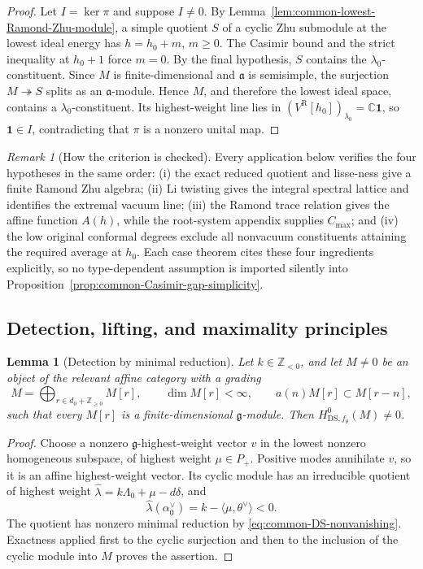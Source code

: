 \documentclass[11pt,reqno]{amsart}
\newtheorem{lemma}[theorem]{Lemma}
\theoremstyle{definition}
\theoremstyle{remark}
\newtheorem{remark}[theorem]{Remark}
\begin{document}
\begin{proof}
Let $I=\ker\pi$ and suppose $I\ne0$.  By
Lemma~\ref{lem:common-lowest-Ramond-Zhu-module}, a simple quotient $S$ of
a cyclic Zhu submodule at the lowest ideal energy has
$h=h_0+m$, $m\ge0$.  The Casimir bound and the strict inequality at
$h_0+1$ force $m=0$.  By the final hypothesis, $S$ contains the
$\lambda_0$-constituent.  Since $M$ is finite-dimensional and
$\mathfrak a$ is semisimple, the surjection $M\twoheadrightarrow S$ splits
as an $\mathfrak a$-module.  Hence $M$, and therefore the lowest ideal
space, contains a $\lambda_0$-constituent.  Its highest-weight line lies in
$(V^{\mathrm R}[h_0])_{\lambda_0}=\mathbb C\mathbf1$, so
$\mathbf1\in I$, contradicting that $\pi$ is a nonzero unital map.
\end{proof}

\begin{remark}[How the criterion is checked]

Every application below verifies the four hypotheses in the same order:
(i) the exact reduced quotient and lisse-ness give a finite Ramond Zhu
algebra; (ii) Li twisting gives the integral spectral lattice and identifies
the extremal vacuum line; (iii) the Ramond trace relation gives the affine
function \(A(h)\), while the root-system appendix supplies
\(C_{\max}\); and (iv) the low original conformal degrees exclude all
nonvacuum constituents attaining the required average at \(h_0\).  Each
case theorem cites these four ingredients explicitly, so no type-dependent
assumption is imported silently into Proposition~\ref{prop:common-Casimir-gap-simplicity}.
\end{remark}

\subsection{Detection, lifting, and maximality principles}


\begin{lemma}[Detection by minimal reduction]
\label{lem:common-DS-detection}
Let $k\in\mathbb Z_{<0}$, and let $M\ne0$ be an object of the relevant affine
category with a grading
\[
 M=\bigoplus_{r\in d_0+\mathbb Z_{\ge0}}M[r],
 \qquad \dim M[r]<\infty,
 \qquad a(n)M[r]\subset M[r-n],
\]
such that every $M[r]$ is a finite-dimensional $\mathfrak g$-module.  Then
$H^0_{\mathrm{DS},f_\theta}(M)\ne0$.
\end{lemma}

\begin{proof}
Choose a nonzero $\mathfrak g$-highest-weight vector $v$ in the lowest
nonzero homogeneous subspace, of highest weight $\mu\in P_+$.  Positive
modes annihilate $v$, so it is an affine highest-weight vector.  Its cyclic
module has an irreducible quotient of highest weight
$\widehat\lambda=k\Lambda_0+\mu-d\delta$, and
\[
 \widehat\lambda(\alpha_0^\vee)
 =k-\langle\mu,\theta^\vee\rangle<0.
\]
The quotient has nonzero minimal reduction by
\eqref{eq:common-DS-nonvanishing}.  Exactness applied first to the cyclic
surjection and then to the inclusion of the cyclic module into $M$ proves
the assertion.
\end{proof}
\end{document}
